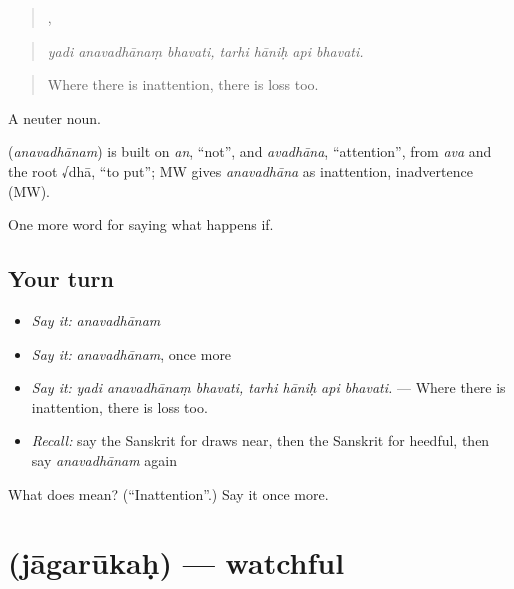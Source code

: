 \begin{quote}
  ,    
\end{quote}

\begin{quote}
\emph{yadi anavadhānaṃ bhavati, tarhi hāniḥ api bhavati.}
\end{quote}

\begin{quote}
Where there is inattention, there is loss too.
\end{quote}

A neuter noun.

\begin{cousinweb}
\textbf{} (\emph{anavadhānam}) is built on \emph{an}, \textquotedblleft{}not\textquotedblright{}, and \emph{avadhāna}, \textquotedblleft{}attention\textquotedblright{}, from \emph{ava} and the root √dhā, \textquotedblleft{}to put\textquotedblright{}; MW gives \emph{anavadhāna} as inattention, inadvertence (MW).
\end{cousinweb}

\begin{grammarlens}[title={What you've built}]
One more word for saying what happens if.
\end{grammarlens}

\subsection*{Your turn}
\begin{itemize}
\raggedright
  \item \emph{Say it:} \emph{anavadhānam}
  \item \emph{Say it:} \emph{anavadhānam}, once more
  \item \emph{Say it:} \emph{yadi anavadhānaṃ bhavati, tarhi hāniḥ api bhavati.} — Where there is inattention, there is loss too.
  \item \emph{Recall:} say the Sanskrit for draws near, then the Sanskrit for heedful, then say \emph{anavadhānam} again
\end{itemize}

\begin{tcolorbox}[breakable,colback=teal!4,colframe=teal!35!black,title={Before you move on}]
What does  mean? (\textquotedblleft{}Inattention\textquotedblright{}.) Say it once more.
\end{tcolorbox}
\section[\texorpdfstring{\sk{जागरूकः} (jāgarūkaḥ)}{जागरूकः (jāgarūkaḥ)}]{ (jāgarūkaḥ) — watchful}

